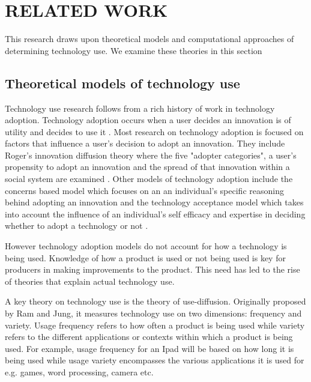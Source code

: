 \documentclass{acm_proc_article-sp}
\begin{document}
\section{RELATED WORK} \label{section:relatedwork}
This research draws upon theoretical models and computational approaches of determining technology use. We examine these theories in this section
\subsection{Theoretical models of technology use}
Technology use research follows from a rich history of work in technology adoption. Technology adoption occurs when a user decides an innovation is of utility and decides to use it \cite{straub2009understanding}. Most research on technology adoption is focused on factors that influence a user's decision to adopt an innovation. They include Roger's innovation diffusion theory where the five "adopter categories", a user's propensity to adopt an innovation and the spread of that innovation within a social system are examined \cite{rogers2010diffusion}. Other models of technology adoption include the concerns based model which focuses on an an individual's specific reasoning behind adopting an innovation \cite{fuller1975concerns, hall1979concerns} and the technology acceptance model \cite{legris2003people} which takes into account the influence of an individual's self efficacy and expertise in deciding whether to adopt a technology or not \cite{legris2003people}.

However technology adoption models do not account for how a technology is being used. Knowledge of how a product is used or not being used is key for producers in making improvements to the product. This need has led to the rise of theories that explain actual technology use.

A key theory on technology use is the theory of use-diffusion. Originally proposed by Ram and Jung\cite{ram1990conceptualization}, it measures technology use on two dimensions: frequency and variety. Usage frequency refers to how often a product is being used while variety refers to the different applications or contexts within which a product is being used. For example, usage frequency for an Ipad will be based on how long it is being used while usage variety encompasses the various applications it is used for e.g. games, word processing, camera etc.
\end{document}
